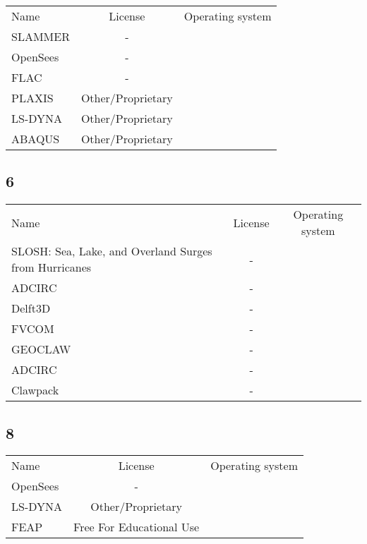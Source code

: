 \begin{table}[]
    \centering
    \begin{tabular}{l|cc}
    \toprule
    Name &  License & Operating system\\ 
        SLAMMER & - &\\
        OpenSees & - &\\
        FLAC & - &\\
        PLAXIS &  Other/Proprietary  &\\
        LS-DYNA &  Other/Proprietary  &\\
        ABAQUS &  Other/Proprietary  &\\ 
    \bottomrule
    \end{tabular}
\end{table}

\subsection{6}

\begin{table}[]
    \centering
    \begin{tabular}{l|cc}
    \toprule
    Name &  License & Operating system\\ 
        SLOSH: Sea, Lake, and Overland Surges from Hurricanes & - &\\
        ADCIRC & - &\\
        Delft3D & - &\\
        FVCOM & - &\\
        GEOCLAW & - &\\
        ADCIRC & - &\\
        Clawpack & - &\\ 
    \bottomrule
    \end{tabular}
\end{table}

\subsection{8}

\begin{table}[]
    \centering
    \begin{tabular}{l|cc}
    \toprule
    Name &  License & Operating system\\ 
        OpenSees & - &\\
        LS-DYNA &  Other/Proprietary  &\\
        FEAP &  Free For Educational Use &\\ 
    \bottomrule
    \end{tabular}
\end{table}

